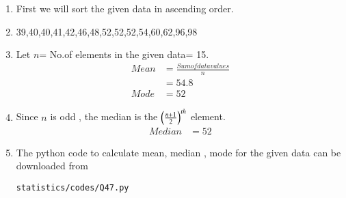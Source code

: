 \renewcommand{\theequation}{\theenumi}
\begin{enumerate}[label=\thesection.\arabic*.,ref=\thesection.\theenumi]
\item First we will sort the given data in ascending order.  
\item 39,40,40,41,42,46,48,52,52,52,54,60,62,96,98
\item Let $n$= No.of elements in the given data= 15.
\begin{align}
Mean &= \frac{Sum of data values}{n}\\
&= 54.8\\
Mode &= 52
\end{align}
\item Since $n$ is odd , the median is the $\left(\frac{n+1}{2}\right)^{th}$ element.
\begin{align}
Median &= 52
\end{align} 
\item The python code to calculate mean, median , mode for the given data can be downloaded from 
\begin{lstlisting}
statistics/codes/Q47.py
\end{lstlisting}


\end{enumerate}